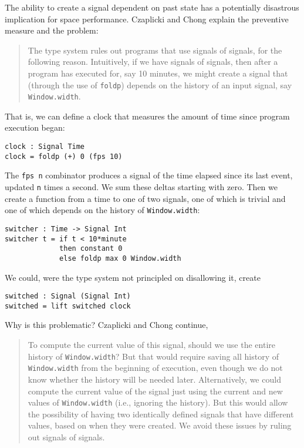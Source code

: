 \documentclass{article}
\begin{document}
The ability to create a signal dependent on past state has a potentially
disastrous implication for space performance. Czaplicki and Chong
explain the preventive measure and the problem:

\begin{quote}
The type system rules out programs that use signals of signals, for the
following reason. Intuitively, if we have signals of signals, then after
a program has executed for, say 10 minutes, we might create a signal
that (through the use of \texttt{foldp}) depends on the history of an
input signal, say \texttt{Window.width}. \cite{CzaplickiC13}
\end{quote}

That is, we can define a clock that measures the amount of time since
program execution began:

\begin{verbatim}
clock : Signal Time
clock = foldp (+) 0 (fps 10)
\end{verbatim}

The \texttt{fps n} combinator produces a signal of the time elapsed
since its last event, updated \texttt{n} times a second. We sum these
deltas starting with zero. Then we create a function from a time to one
of two signals, one of which is trivial and one of which depends on the
history of \texttt{Window.width}:

\begin{verbatim}
switcher : Time -> Signal Int
switcher t = if t < 10*minute
             then constant 0
             else foldp max 0 Window.width
\end{verbatim}

We could, were the type system not principled on disallowing it, create

\begin{verbatim}
switched : Signal (Signal Int)
switched = lift switched clock
\end{verbatim}

Why is this problematic? Czaplicki and Chong continue,

\begin{quote}
To compute the current value of this signal, should we use the entire
history of \texttt{Window.width}? But that would require saving all
history of \texttt{Window.width} from the beginning of execution, even
though we do not know whether the history will be needed later.
Alternatively, we could compute the current value of the signal just
using the current and new values of \texttt{Window.width} (i.e.,
ignoring the history). But this would allow the possibility of having
two identically defined signals that have different values, based on
when they were created. We avoid these issues by ruling out signals of
signals. \cite{CzaplickiC13}
\end{quote}
\end{document}
